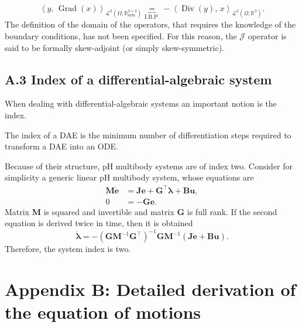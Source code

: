 \documentclass{svjour3}                     %
\DeclareMathOperator*{\Grad}{Grad}
\DeclareMathOperator*{\Div}{Div}
\begin{document}
\begin{equation*}
\left\langle y, \, \Grad(x) \right\rangle_{\mathscr{L}^2(\Omega, \mathbb{R}^{3\times 3}_{\text{sym}})} 
\underbrace{=}_{\text{I.B.P.}} -\left\langle\Div(y), \, x \right\rangle_{\mathscr{L}^2(\Omega, \mathbb{R}^3)}.
\end{equation*}
The definition of the domain of the operators, that requires the knowledge of the boundary conditions, has not been specified. For this reason, the $\bm{\mathcal{J}}$ operator is said to be formally skew-adjoint (or simply skew-symmetric).

\subsection*{\normalsize \textbf{A.3 Index of a differential-algebraic system}}
When dealing with differential-algebraic systems an important notion is the index.
\begin{definition}
The index of a DAE is the minimum number of differentiation steps required to transform a DAE into an ODE.
\end{definition}
Because of their structure, pH multibody systems are of index two. Consider for simplicity a generic linear pH multibody system, whose equations are
\begin{equation*}
\begin{aligned}
\mathbf{M} \dot{\mathbf{e}} &=  \mathbf{J}\mathbf{e} + \mathbf{G}^\top \bm{\lambda} + \mathbf{B}\mathbf{u}, \\ 
0 &= -\mathbf{G}\mathbf{e}.
\end{aligned}
\end{equation*}
Matrix $\mathbf{M}$ is squared and invertible and matrix $\mathbf{G}$ is full rank. If the second equation is derived twice in time, then it is obtained
\[\dot{\bm{\lambda}} = - (\mathbf{G} \mathbf{M}^{-1} \mathbf{G}^\top)^{-1} \mathbf{G} \mathbf{M}^{-1} (\mathbf{J} \dot{\mathbf{e}} + \mathbf{B}\dot{\mathbf{u}}).
\]
Therefore, the system index is two.  
\section*{Appendix B: Detailed derivation of the equation of motions}
\end{document}
